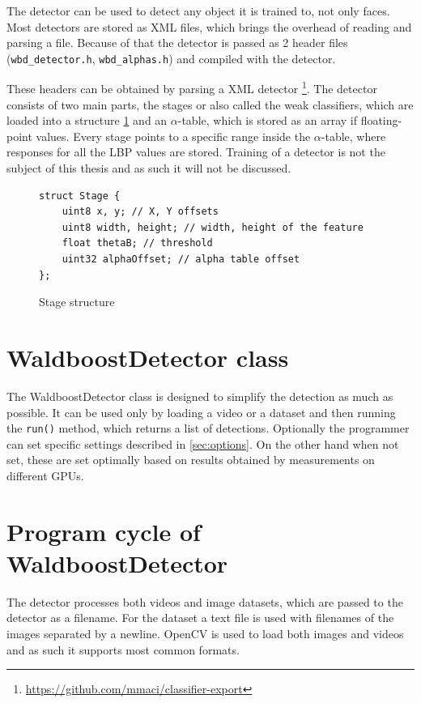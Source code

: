 The detector can be used to detect any object it is trained to, not only faces. Most detectors are stored as XML files, which brings the overhead of reading and parsing a file. Because of that the detector is passed as 2 header files (\verb|wbd_detector.h|, \verb|wbd_alphas.h|) and compiled with the detector.

These headers can be obtained by parsing a XML detector \footnote{\url{https://github.com/mmaci/classifier-export}}. The detector consists of two main parts, the stages or also called the weak classifiers, which are loaded into a structure \ref{fig:stage} and an $\alpha$-table, which is stored as an array if floating-point values. Every stage points to a specific range inside the $\alpha$-table, where responses for all the LBP values are stored. Training of a detector is not the subject of this thesis and as such it will not be discussed.

\begin{figure}[h!]
\begin{verbatim}
struct Stage {
    uint8 x, y; // X, Y offsets
    uint8 width, height; // width, height of the feature
    float thetaB; // threshold
    uint32 alphaOffset; // alpha table offset
};
\end{verbatim}
\caption{Stage structure}
\label{fig:stage}
\end{figure}

\section{WaldboostDetector class}

The WaldboostDetector class is designed to simplify the detection as much as possible. It can be used only by loading a video or a dataset and then running the \verb|run()| method, which returns a list of detections. Optionally the programmer can set specific settings described in \ref{sec:options}. On the other hand when not set, these are set optimally based on results obtained by measurements on different GPUs.

\section{Program cycle of WaldboostDetector}

The detector processes both videos and image datasets, which are passed to the detector as a filename. For the dataset a text file is used with filenames of the images separated by a newline. OpenCV is used to load both images and videos and as such it supports most common formats.

